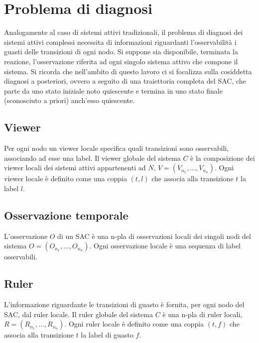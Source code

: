 \section{Problema di diagnosi}
Analogamente al caso di sistemi attivi tradizionali, il problema di diagnosi dei sistemi attivi complessi necessita di informazioni riguardanti l'osservabilità  i guasti delle transizioni di ogni nodo. Si suppone sia disponibile, terminata la reazione, l'osservazione riferita ad ogni singolo sistema attivo che compone il sistema. Si ricorda che nell'ambito di questo lavoro ci si focalizza sulla cosiddetta diagnosi a posteriori, ovvero a seguito di una traiettoria completa del SAC, che parte da uno stato iniziale noto quiescente e termina in uno stato finale (sconosciuto a priori) anch'esso quiescente. 

\subsection{Viewer}
Per ogni nodo un viewer locale specifica quali transizioni sono osservabili, associando ad esse una label. Il viewer globale del sistema $C$ è la composizione dei viewer locali dei sistemi attivi appartenenti ad $N$, $V = (V_{n_1}, \ldots, V_{n_n})$. Ogni viewer locale è definito come una coppia $(t,l)$ che associa alla transizione $t$ la label $l$.

\subsection{Osservazione temporale}
L'osservazione $O$ di un SAC è una n-pla di osservazioni locali dei singoli nodi del sistema $O = (O_{n_1}, \ldots, O_{n_n})$. Ogni osservazione locale è una sequenza di label osservabili.

\subsection{Ruler}
L'informazione riguardante le transizioni di guasto è fornita, per ogni nodo del SAC, dal ruler locale. Il ruler globale del sistema $C$ è una n-pla di ruler locali, $R = (R_{n_1}, \ldots, R_{n_n})$. Ogni ruler locale è definito come una coppia $(t,f)$ che associa alla transizione $t$ la label di guasto $f$.

